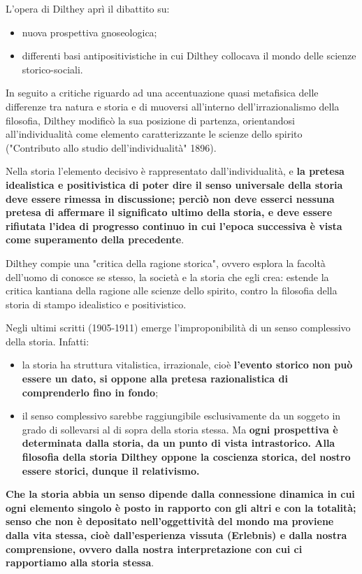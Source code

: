 L'opera di Dilthey aprì il dibattito su:

\begin{itemize}
	\item nuova prospettiva gnoseologica;
	\item differenti basi antipositivistiche  in cui Dilthey collocava il mondo delle scienze storico-sociali.
\end{itemize}  

In seguito a critiche riguardo ad una accentuazione quasi metafisica delle differenze tra natura e storia e di muoversi all'interno dell'irrazionalismo della filosofia, Dilthey modificò la sua posizione di partenza, orientandosi all'individualità come elemento caratterizzante le scienze dello spirito ("Contributo allo studio dell'individualità" 1896).

Nella storia l'elemento decisivo è rappresentato dall'individualità, e \textbf{la pretesa idealistica e positivistica di poter dire il senso universale della storia deve essere rimessa in discussione; perciò non deve esserci nessuna pretesa di affermare il significato ultimo della storia, e deve essere rifiutata l'idea di progresso continuo in cui l'epoca successiva è vista come superamento della precedente}.

Dilthey compie una "critica della ragione storica", ovvero esplora la facoltà dell'uomo di conosce se stesso, la società e la storia che egli crea: estende la critica kantiana della ragione alle scienze dello spirito, contro la filosofia della storia di stampo idealistico e positivistico.

Negli ultimi scritti (1905-1911) emerge l'improponibilità di un senso complessivo della storia. Infatti:

\begin{itemize}
	\item la storia ha struttura vitalistica, irrazionale, cioè \textbf{l'evento storico non può essere un dato, si oppone alla pretesa razionalistica di comprenderlo fino in fondo};
	\item il senso complessivo sarebbe raggiungibile esclusivamente da un soggeto in grado di sollevarsi al di sopra della storia stessa. Ma \textbf{ogni prospettiva è determinata dalla storia, da un punto di vista intrastorico. Alla filosofia della storia Dilthey oppone la coscienza storica, del nostro essere storici, dunque il relativismo.}
\end{itemize} 

\textbf{Che la storia abbia un senso dipende dalla connessione dinamica in cui ogni elemento singolo è posto in rapporto con gli altri e con la totalità; senso che non è depositato nell'oggettività del mondo ma proviene dalla vita stessa, cioè dall'esperienza vissuta (Erlebnis) e dalla nostra comprensione, ovvero dalla nostra interpretazione con cui ci rapportiamo alla storia stessa}.

